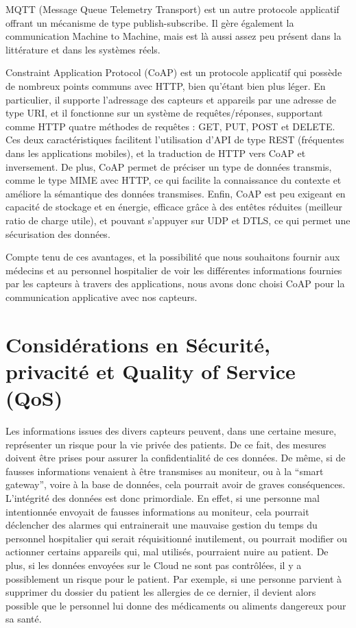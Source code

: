 \documentclass{article}
\begin{document}
MQTT (Message Queue Telemetry Transport) \cite{MQTT} est un autre protocole applicatif offrant un mécanisme de type publish-subscribe. Il gère également la communication Machine to Machine, mais est là aussi assez peu présent dans la littérature et dans les systèmes réels.

Constraint Application Protocol (CoAP) \cite{CoAP} est un protocole applicatif qui possède de nombreux points communs avec HTTP, bien qu’étant bien plus léger. En particulier, il supporte l’adressage des capteurs et appareils par une adresse de type URI, et il fonctionne sur un système de requêtes/réponses, supportant comme HTTP quatre méthodes de requêtes : GET, PUT, POST et DELETE. Ces deux caractéristiques facilitent l’utilisation d’API de type REST (fréquentes dans les applications mobiles), et la traduction de HTTP vers CoAP et inversement. De plus, CoAP permet de préciser un type de données transmis, comme le type MIME avec HTTP, ce qui facilite la connaissance du contexte et améliore la sémantique des données transmises. Enfin, CoAP est peu exigeant en capacité de stockage et en énergie, efficace grâce à des entêtes réduites (meilleur ratio de charge utile), et pouvant s’appuyer sur UDP et DTLS, ce qui permet une sécurisation des données.

Compte tenu de ces avantages, et la possibilité que nous souhaitons fournir aux médecins et au personnel hospitalier de voir les différentes informations fournies par les capteurs à travers des applications, nous avons donc choisi CoAP pour la communication applicative avec nos capteurs.

\section {Considérations en Sécurité, privacité et Quality of Service (QoS)}

Les informations issues des divers capteurs peuvent, dans une certaine mesure, représenter un risque pour la vie privée des patients. De ce fait, des mesures doivent être prises pour assurer la confidentialité de ces données. De même, si de fausses informations venaient à être transmises au moniteur, ou à la “smart gateway”, voire à la base de données, cela pourrait avoir de graves conséquences. L'intégrité des données est donc primordiale. En effet, si une personne mal intentionnée envoyait de fausses informations au moniteur, cela pourrait déclencher des alarmes qui entrainerait une mauvaise gestion du temps du personnel hospitalier qui serait réquisitionné inutilement, ou pourrait modifier ou actionner certains appareils qui, mal utilisés, pourraient nuire au patient. De plus, si les données envoyées sur le Cloud ne sont pas contrôlées, il y a possiblement un risque pour le patient. Par exemple, si une personne parvient à supprimer du dossier du patient les allergies de ce dernier, il devient alors possible que le personnel lui donne des médicaments ou aliments dangereux pour sa santé.
\end{document}
